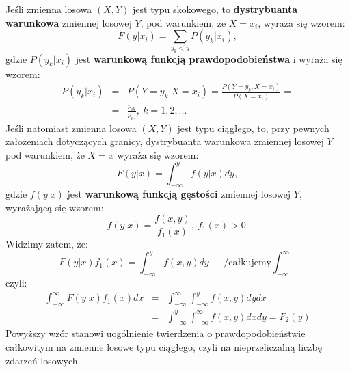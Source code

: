 \documentclass[10pt,a4paper]{article}
\begin{document}
Jeśli zmienna losowa $(X,Y)$ jest typu skokowego, to \textbf{dystrybuanta warunkowa} zmiennej losowej $Y$, pod warunkiem, że $X=x_i$, wyraża się wzorem:
\begin{equation}
F(y|x_i)=\sum_{y_k<y}P(y_k|x_i),
\end{equation}
gdzie $P(y_k|x_i)$ jest \textbf{warunkową funkcją prawdopodobieństwa} i wyraża się wzorem:
\begin{eqnarray}
P(y_k|x_i) & = & P(Y=y_k|X=x_i) = \frac{P(Y=y_k,X=x_i)}{P(X=x_i)} = \\\nonumber
& = & \frac{p_{ik}}{p_{i\cdot}},~k=1,2,...
\end{eqnarray}
Jeśli natomiast zmienna losowa $(X,Y)$ jest typu ciągłego, to, przy pewnych założeniach dotyczących granicy, dystrybuanta warunkowa zmiennej losowej $Y$ pod warunkiem,
że $X=x$ wyraża się wzorem:
\begin{equation}
F(y|x)=\int_{-\infty}^yf(y|x)dy,
\end{equation}
gdzie $f(y|x)$ jest \textbf{warunkową funkcją gęstości} zmiennej losowej $Y$, wyrażającą się wzorem:
\begin{equation}
f(y|x) = \frac{f(x,y)}{f_1(x)},~f_1(x) > 0.
\end{equation}
Widzimy zatem, że:
\[F(y|x)f_1(x) = \int_{-\infty}^yf(x,y)dy~~~~~~~/\textrm{całkujemy}\int_{-\infty}^{\infty}\]
czyli:
\begin{eqnarray}
\nonumber \int_{-\infty}^{\infty}F(y|x)f_1(x)dx & = & \int_{-\infty}^{\infty}\int_{-\infty}^yf(x,y)dydx\\
\nonumber & = & \int_{-\infty}^y\int_{-\infty}^{\infty}f(x,y)dxdy = F_2(y)
\end{eqnarray}
Powyższy wzór stanowi uogólnienie twierdzenia o prawdopodobieństwie całkowitym na zmienne losowe typu ciągłego, czyli na nieprzeliczalną liczbę zdarzeń losowych.
\end{document}
